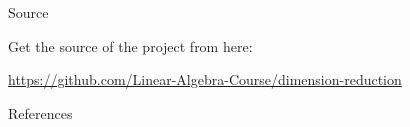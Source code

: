 \documentclass[10pt]{beamer}
\begin{document}
\begin{frame}{Source}

  Get the source of the project from here:

  \begin{center}\url{https://github.com/Linear-Algebra-Course/dimension-reduction}\end{center}


  \begin{center}\ccbysa\end{center}

\end{frame}
\begin{frame}[allowframebreaks]{References}
\cite{Ghodsi2006}
\cite{Kokiopoulou2011}
\cite{Projections}
  
  

\end{frame}
\end{document}
